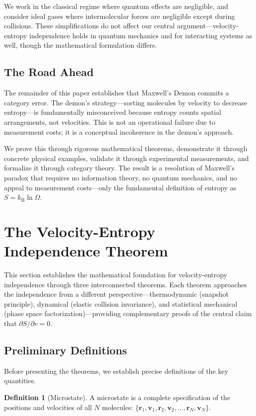 \documentclass[10pt,twocolumn,letterpaper]{article}
\theoremstyle{definition}
\newtheorem{definition}[theorem]{Definition}
\theoremstyle{remark}
\newcommand{\kb}{k_\text{B}}
\newcommand{\Om}{\Omega}
\begin{document}
We work in the classical regime where quantum effects are negligible, and consider ideal gases where intermolecular forces are negligible except during collisions. These simplifications do not affect our central argument—velocity-entropy independence holds in quantum mechanics and for interacting systems as well, though the mathematical formulation differs.

\subsection{The Road Ahead}

The remainder of this paper establishes that Maxwell's Demon commits a category error. The demon's strategy—sorting molecules by velocity to decrease entropy—is fundamentally misconceived because entropy counts spatial arrangements, not velocities. This is not an operational failure due to measurement costs; it is a conceptual incoherence in the demon's approach.

We prove this through rigorous mathematical theorems, demonstrate it through concrete physical examples, validate it through experimental measurements, and formalize it through category theory. The result is a resolution of Maxwell's paradox that requires no information theory, no quantum mechanics, and no appeal to measurement costs—only the fundamental definition of entropy as $S = \kb \ln \Om$.

\section{The Velocity-Entropy Independence Theorem}
\label{sec:theorem}

This section establishes the mathematical foundation for velocity-entropy independence through three interconnected theorems. Each theorem approaches the independence from a different perspective—thermodynamic (snapshot principle), dynamical (elastic collision invariance), and statistical mechanical (phase space factorization)—providing complementary proofs of the central claim that $\partial S/\partial v = 0$.

\subsection{Preliminary Definitions}

Before presenting the theorems, we establish precise definitions of the key quantities.

\begin{definition}[Microstate]
A microstate is a complete specification of the positions and velocities of all $N$ molecules: $\{\mathbf{r}_1, \mathbf{v}_1, \mathbf{r}_2, \mathbf{v}_2, \ldots, \mathbf{r}_N, \mathbf{v}_N\}$.
\end{definition}
\end{document}
